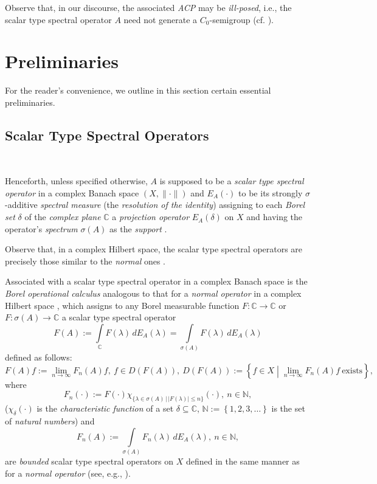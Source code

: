 \documentclass{amsart}
\theoremstyle{plain}
\theoremstyle{definition}
\begin{document}
Observe that, in our discourse, the associated \textit{ACP} may be \textit{ill-posed}, i.e., the scalar type spectral operator $A$ need not generate a $C_0$-semigroup (cf. \cite{Markin2002(2)}). 

\section[Preliminaries]{Preliminaries}

For the reader's convenience, we outline in this section certain essential preliminaries.

\subsection{Scalar Type Spectral Operators}\ 

Henceforth, unless specified otherwise, $A$ is supposed to be a {\it scalar type spectral operator} in a complex Banach space $(X,\|\cdot\|)$ and $E_A(\cdot)$ to be its
strongly $\sigma$-additive \textit{spectral measure} (the \textit{resolution of the identity}) assigning to each {\it Borel set} $\delta$ of the \textit{complex plane} ${{\mathbb C}}$ a {\it projection operator} $E_A(\delta)$ on $X$ and having the operator's \textit{spectrum} $\sigma(A)$ as the {\it support} \cite{Survey58,Dun-SchIII}.

Observe that, in a complex Hilbert space, the scalar type spectral operators are precisely those similar to the {\it normal} ones \cite{Wermer}.

Associated with a scalar type spectral operator in a complex Banach space is the {\it Borel operational calculus} analogous to that for a \textit{normal operator} in a complex Hilbert space \cite{Survey58,Dun-SchII,Dun-SchIII,Plesner}, which assigns to any Borel measurable function $F:{{\mathbb C}}\to {{\mathbb C}}$ or $F:\sigma(A)\to {{\mathbb C}}$ a scalar type spectral operator
\begin{equation*}
F(A):=\int\limits_{{\mathbb C}} F(\lambda)\,dE_A(\lambda)
=\int\limits_{\sigma(A)} F(\lambda)\,dE_A(\lambda)
\end{equation*}
defined as follows:
\[
F(A)f:=\lim_{n\to\infty}F_n(A)f,\ f\in D(F(A)),\
D(F(A)):=\left\{f\in X\middle| \lim_{n\to\infty}F_n(A)f\ \text{exists}\right\},
\]
where
\begin{equation*}
F_n(\cdot):=F(\cdot)\chi_{\{\lambda\in\sigma(A)\,|\,|F(\lambda)|\le n\}}(\cdot),
\ n\in{{\mathbb N}},
\end{equation*}
($\chi_\delta(\cdot)$ is the {\it characteristic function} of a set $\delta\subseteq {{\mathbb C}}$, ${{\mathbb N}}:=\left\{1,2,3,\dots\right\}$ is the set of \textit{natural numbers}) and
\begin{equation*}
F_n(A):=\int\limits_{\sigma(A)} F_n(\lambda)\,dE_A(\lambda),\ n\in{{\mathbb N}},
\end{equation*}
are {\it bounded} scalar type spectral operators on $X$ defined in the same manner as for a {\it normal operator} (see, e.g., \cite{Dun-SchII,Plesner}).
\end{document}
